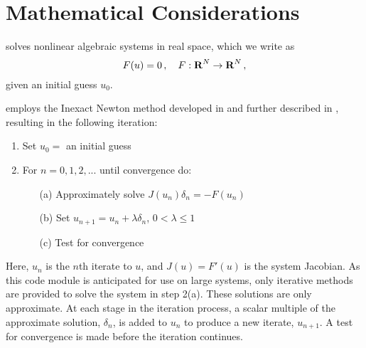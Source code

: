 \chapter{Mathematical Considerations}\label{s:math}

{\kinsol} solves nonlinear algebraic systems in real space, which
we write as 
\begin{equation}\label{nonlinear_system}
  F(u) = 0 \, , \quad F:\mbox{\bf R}^N \rightarrow \mbox{\bf R}^N \, ,
\end{equation}
given an initial guess $u_0$. 

{\kinsol} employs the Inexact Newton method developed in
\cite{Bro:87,BrSa:90,DES:82} and further described in
\cite{DeSc:96,Kel:95}, resulting in the following iteration:

 \vspace{1ex}
\begin{enumerate}
   \item Set $u_0 = $ an initial guess
   \item For $n = 0, 1, 2,...$ until convergence do:
      \begin{itemize}
          \item[(a)] Approximately solve $J(u_n)\delta_n = -
          F(u_n)$ \label{e:Newton}
          \item[(b)] Set $u_{n+1} = u_n + \lambda \delta_n$,
          $0 < \lambda \leq 1$
          \item[(c)] Test for convergence
      \end{itemize}
\end{enumerate}
 Here, $u_n$ is the
$n$th iterate to $u$, and $J(u) = F'(u)$ is the system Jacobian.
As this code module is anticipated for use on large systems, only
iterative methods are provided to solve the system in step 2(a).
These solutions are only approximate.  At each stage in the
iteration process, a scalar multiple of the approximate solution,
$\delta_n$, is added to $u_n$ to produce a new iterate, $u_{n+1}$.
A test for convergence is made before the iteration continues.

